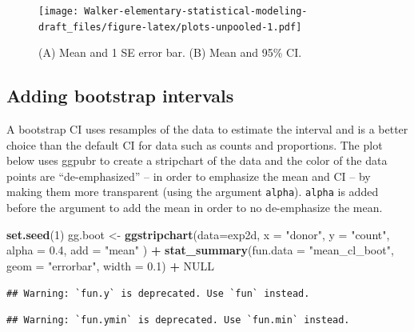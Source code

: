 \documentclass[]{book}
\newenvironment{Shaded}{\begin{snugshade}}{\end{snugshade}}
\newcommand{\DataTypeTok}[1]{\textcolor[rgb]{0.13,0.29,0.53}{#1}}
\newcommand{\DecValTok}[1]{\textcolor[rgb]{0.00,0.00,0.81}{#1}}
\newcommand{\FloatTok}[1]{\textcolor[rgb]{0.00,0.00,0.81}{#1}}
\newcommand{\KeywordTok}[1]{\textcolor[rgb]{0.13,0.29,0.53}{\textbf{#1}}}
\newcommand{\NormalTok}[1]{#1}
\newcommand{\OperatorTok}[1]{\textcolor[rgb]{0.81,0.36,0.00}{\textbf{#1}}}
\newcommand{\OtherTok}[1]{\textcolor[rgb]{0.56,0.35,0.01}{#1}}
\newcommand{\StringTok}[1]{\textcolor[rgb]{0.31,0.60,0.02}{#1}}
\begin{document}
\begin{figure}
\centering
\texttt{[image: Walker-elementary-statistical-modeling-draft\_files/figure-latex/plots-unpooled-1.pdf]}
\caption{\label{fig:plots-unpooled}(A) Mean and 1 SE error bar. (B) Mean and 95\% CI.}
\end{figure}

\hypertarget{adding-bootstrap-intervals}{%
\subsection{Adding bootstrap intervals}\label{adding-bootstrap-intervals}}

A bootstrap CI uses resamples of the data to estimate the interval and is a better choice than the default CI for data such as counts and proportions. The plot below uses ggpubr to create a stripchart of the data and the color of the data points are ``de-emphasized'' -- in order to emphasize the mean and CI -- by making them more transparent (using the argument \texttt{alpha}). \texttt{alpha} is added before the argument to add the mean in order to no de-emphasize the mean.

\begin{Shaded}
\begin{Highlighting}[]
\KeywordTok{set.seed}\NormalTok{(}\DecValTok{1}\NormalTok{)}
\NormalTok{gg.boot <-}\StringTok{ }\KeywordTok{ggstripchart}\NormalTok{(}\DataTypeTok{data=}\NormalTok{exp2d,}
                   \DataTypeTok{x =} \StringTok{"donor"}\NormalTok{, }
                   \DataTypeTok{y =} \StringTok{"count"}\NormalTok{, }
                   \DataTypeTok{alpha =} \FloatTok{0.4}\NormalTok{,}
                   \DataTypeTok{add =} \StringTok{"mean"}
\NormalTok{) }\OperatorTok{+}\StringTok{ }
\StringTok{  }\KeywordTok{stat_summary}\NormalTok{(}\DataTypeTok{fun.data =} \StringTok{"mean_cl_boot"}\NormalTok{, }
               \DataTypeTok{geom =} \StringTok{"errorbar"}\NormalTok{, }
               \DataTypeTok{width =} \FloatTok{0.1}\NormalTok{) }\OperatorTok{+}
\StringTok{  }\OtherTok{NULL}
\end{Highlighting}
\end{Shaded}

\begin{verbatim}
## Warning: `fun.y` is deprecated. Use `fun` instead.
\end{verbatim}

\begin{verbatim}
## Warning: `fun.ymin` is deprecated. Use `fun.min` instead.
\end{verbatim}
\end{document}
